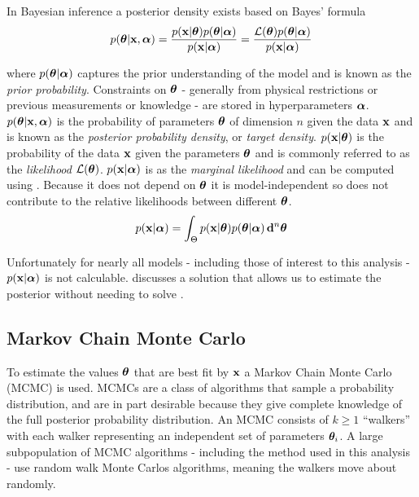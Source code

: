 In Bayesian inference a posterior density exists based on Bayes' formula
\begin{equation}
p(\boldsymbol{\theta}|\mathbf{x}, \boldsymbol{\alpha}) = \frac{p(\mathbf{x}|\boldsymbol{\theta})
p(\boldsymbol{\theta}|\boldsymbol{\alpha})}{p(\mathbf{x}|\boldsymbol{\alpha})} = \frac{\mathcal{L}(\boldsymbol{\theta})
p(\boldsymbol{\theta}|\boldsymbol{\alpha})}{p(\mathbf{x}|\boldsymbol{\alpha})}
\end{equation}

\noindent where $p(\boldsymbol{\theta}|\boldsymbol{\alpha})$ captures the prior understanding of the model and is known as the
\textit{prior probability}.  Constraints on $\boldsymbol{\theta}$ - generally from physical restrictions or previous measurements or
knowledge - are stored in hyperparameters $\boldsymbol{\alpha}$.  $p(\boldsymbol{\theta}|\mathbf{x}, \boldsymbol{\alpha})$ is the probability of
parameters $\boldsymbol{\theta}$ of dimension $n$ given the
data $\mathbf{x}$ and is known as the \textit{posterior probability density}, or \textit{target
density}.  $p(\mathbf{x}|\boldsymbol{\theta})$ is the probability of the data $\mathbf{x}$ given the parameters
$\boldsymbol{\theta}$ and is
commonly referred to as the \textit{likelihood} $\mathcal{L}(\boldsymbol{\theta})$.  $p(\mathbf{x}|\boldsymbol{\alpha})$ is as the
\textit{marginal likelihood}
and can be computed using .  Because it does not depend on
$\boldsymbol{\theta}$ it is model-independent so does not contribute to the relative likelihoods between different
$\boldsymbol{\theta}$.
\begin{equation}
p(\mathbf{x}|\boldsymbol{\alpha}) = \int_{\Theta} p(\mathbf{x}|\boldsymbol{\theta}) p(\boldsymbol{\theta}|\boldsymbol{\alpha})\, \mathbf{d}^n \boldsymbol{\theta}
\label{eq:er_nr_calibrations_parameter_determ_mc_match_p_data}
\end{equation}

Unfortunately for nearly all models - including those of interest to this analysis - $p(\mathbf{x}|\boldsymbol{\alpha})$ is not
calculable.   discusses a solution that allows us to estimate the posterior
without needing to solve .



\subsection{Markov Chain Monte Carlo}
\label{subsec:er_nr_calibrations_parameter_determ_mcmc}
To estimate the values $\boldsymbol{\theta}$ that are best fit by $\mathbf{x}$ a Markov Chain Monte Carlo (MCMC) is used.  MCMCs
are a class of algorithms that sample a probability distribution, and are in part desirable because they
give complete knowledge of the full posterior probability
distribution.  An MCMC consists of $k \geq 1$ ``walkers'' with each walker representing an independent set of parameters
$\boldsymbol{\theta}_i$.  A large
subpopulation of MCMC algorithms - including the method used in this analysis - use random walk Monte Carlos algorithms, meaning the
walkers move about randomly.

